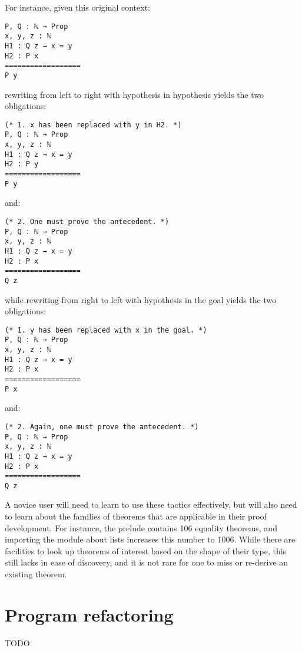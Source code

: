 For instance, given this original context:

\begin{verbatim}
P, Q : ℕ → Prop
x, y, z : ℕ
H1 : Q z → x = y
H2 : P x
==================
P y
\end{verbatim}

rewriting from left to right with hypothesis  in hypothesis
 yields the two obligations:

\begin{verbatim}
(* 1. x has been replaced with y in H2. *)
P, Q : ℕ → Prop
x, y, z : ℕ
H1 : Q z → x = y
H2 : P y
==================
P y
\end{verbatim}

and:

\begin{verbatim}
(* 2. One must prove the antecedent. *)
P, Q : ℕ → Prop
x, y, z : ℕ
H1 : Q z → x = y
H2 : P x
==================
Q z
\end{verbatim}

while rewriting from right to left with hypothesis  in the goal
yields the two obligations:

\begin{verbatim}
(* 1. y has been replaced with x in the goal. *)
P, Q : ℕ → Prop
x, y, z : ℕ
H1 : Q z → x = y
H2 : P x
==================
P x
\end{verbatim}

and:

\begin{verbatim}
(* 2. Again, one must prove the antecedent. *)
P, Q : ℕ → Prop
x, y, z : ℕ
H1 : Q z → x = y
H2 : P x
==================
Q z
\end{verbatim}

A novice user will need to learn to use these tactics effectively, but will also
need to learn about the families of theorems that are applicable in their proof
development.  For instance, the \Coq{} prelude contains 106 equality theorems,
and importing the module about lists increases this number to 1006.  While there
are facilities to look up theorems of interest based on the shape of their type,
this still lacks in ease of discovery, and it is not rare for one to miss or
re-derive an existing theorem.

\section{Program refactoring}

TODO
